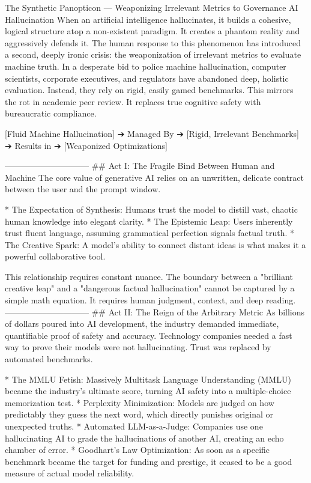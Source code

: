 The Synthetic Panopticon — Weaponizing Irrelevant Metrics to Governance AI Hallucination
When an artificial intelligence hallucinates, it builds a cohesive, logical structure atop a non-existent paradigm. It creates a phantom reality and aggressively defends it.
The human response to this phenomenon has introduced a second, deeply ironic crisis: the weaponization of irrelevant metrics to evaluate machine truth.
In a desperate bid to police machine hallucination, computer scientists, corporate executives, and regulators have abandoned deep, holistic evaluation. Instead, they rely on rigid, easily gamed benchmarks. This mirrors the rot in academic peer review. It replaces true cognitive safety with bureaucratic compliance.

[Fluid Machine Hallucination] ➔ Managed By ➔ [Rigid, Irrelevant Benchmarks] ➔ Results in ➔ [Weaponized Optimizations]

------------------------------
## Act I: The Fragile Bind Between Human and Machine
The core value of generative AI relies on an unwritten, delicate contract between the user and the prompt window.

* The Expectation of Synthesis: Humans trust the model to distill vast, chaotic human knowledge into elegant clarity.
* The Epistemic Leap: Users inherently trust fluent language, assuming grammatical perfection signals factual truth.
* The Creative Spark: A model's ability to connect distant ideas is what makes it a powerful collaborative tool.

This relationship requires constant nuance. The boundary between a "brilliant creative leap" and a "dangerous factual hallucination" cannot be captured by a simple math equation. It requires human judgment, context, and deep reading.
------------------------------
## Act II: The Reign of the Arbitrary Metric
As billions of dollars poured into AI development, the industry demanded immediate, quantifiable proof of safety and accuracy. Technology companies needed a fast way to prove their models were not hallucinating. Trust was replaced by automated benchmarks.

* The MMLU Fetish: Massively Multitask Language Understanding (MMLU) became the industry's ultimate score, turning AI safety into a multiple-choice memorization test.
* Perplexity Minimization: Models are judged on how predictably they guess the next word, which directly punishes original or unexpected truths.
* Automated LLM-as-a-Judge: Companies use one hallucinating AI to grade the hallucinations of another AI, creating an echo chamber of error.
* Goodhart’s Law Optimization: As soon as a specific benchmark became the target for funding and prestige, it ceased to be a good measure of actual model reliability.

